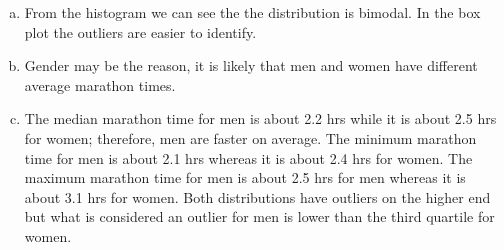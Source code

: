 %

{
\begin{enumerate}[(a)]

\item From the histogram we can see the the distribution is bimodal. In the box plot the outliers are easier to identify.

\item Gender may be the reason, it is likely that men and women have different average marathon times.

\item The median marathon time for men is about 2.2 hrs while it is about 2.5 hrs for women; therefore, men are faster on average. The minimum marathon time for men is about 2.1 hrs whereas it is about 2.4 hrs for women. The maximum marathon time for men is about 2.5 hrs for men whereas it is about 3.1 hrs for women. Both distributions have outliers on the higher end but what is considered an outlier for men is lower than the third quartile for women.

\end{enumerate}
}\label{NYMarathon}

